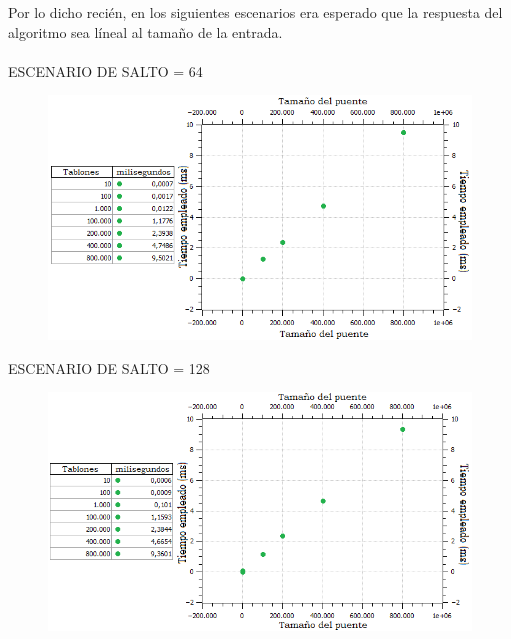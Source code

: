 \documentclass[10pt,a4paper]{article}
\begin{document}
Por lo dicho recién, en los siguientes escenarios era esperado que la respuesta del algoritmo sea líneal al tamaño de la entrada.\\ \\

\indent ESCENARIO DE SALTO = 64
	\begin{figure}[h]
		\begin{center}
		   \includegraphics[scale=0.90]{casosDeTest/GRAFICOS/png/randoms/ej1_random_salto64.png}
		\end{center}
	\end{figure}

\newpage \indent ESCENARIO DE SALTO = 128
	\begin{figure}[h]
		\begin{center}
		   \includegraphics[scale=0.90]{casosDeTest/GRAFICOS/png/randoms/ej1_random_salto128.png}
		\end{center}
	\end{figure}
\end{document}
